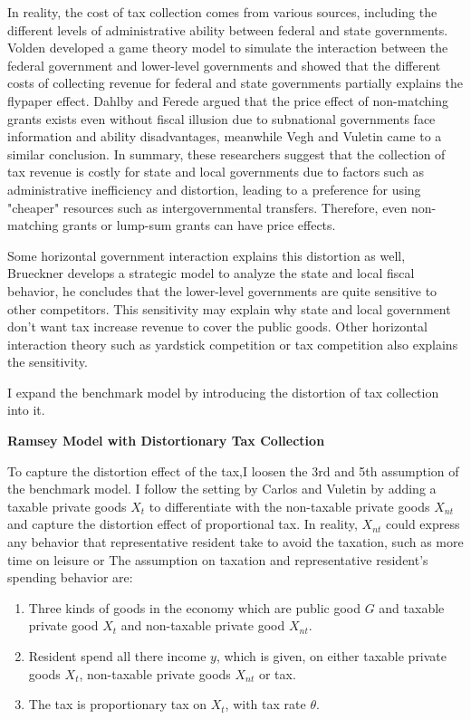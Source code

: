 In reality, the cost of tax collection comes from various sources, including the different levels of administrative ability between federal and state governments. Volden \cite{volden2007intergovernmental} developed a game theory model to simulate the interaction between the federal government and lower-level governments and showed that the different costs of collecting revenue for federal and state governments partially explains the flypaper effect. Dahlby and Ferede \cite{dahlby2016stimulative} argued that the price effect of non-matching grants exists even without fiscal illusion due to subnational governments face information and ability disadvantages, meanwhile Vegh and Vuletin \cite{vegh2016unsticking} came to a similar conclusion. In summary, these researchers suggest that the collection of tax revenue is costly for state and local governments due to factors such as administrative inefficiency and distortion, leading to a preference for using "cheaper" resources such as intergovernmental transfers. Therefore, even non-matching grants or lump-sum grants can have price effects.

Some horizontal government interaction explains this distortion as well, Brueckner \cite{brueckner2003strategic} develops a strategic model to analyze the state and local fiscal behavior, he concludes that the lower-level governments are quite sensitive to other competitors. This sensitivity may explain why state and local government don't want tax increase revenue to cover the public goods. Other horizontal interaction theory such as yardstick competition or tax competition also explains the sensitivity.

I expand the benchmark model by introducing the distortion of tax collection into it.

\textbf{Ramsey Model with Distortionary Tax Collection}

To capture the distortion effect of the tax,I loosen the 3rd and 5th assumption of the benchmark model. I follow the setting by Carlos and Vuletin \cite{vegh2016unsticking} by adding a taxable private goods $X_t$ to differentiate with the non-taxable private goods $X_{nt}$ and capture the distortion effect of proportional tax. In reality, $X_{nt}$ could express any behavior that representative resident take to avoid the taxation, such as more time on leisure or
The assumption on taxation and representative resident's spending behavior are:
\begin{enumerate}
    \item Three kinds of goods in the economy which are public good $G$ and taxable private good $X_t$ and non-taxable private good $X_{nt}$.\label{Xt}
    \item Resident spend all there income $y$, which is given, on either taxable private goods $X_t$, non-taxable private goods $X_{nt}$ or tax.
    \item The tax is proportionary tax on $X_{t}$, with tax rate $\theta$.
\end{enumerate}

